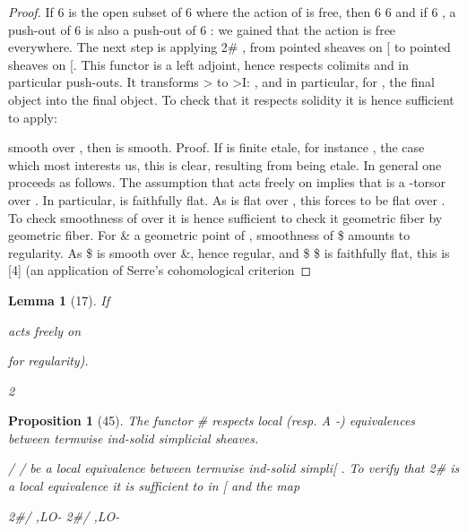 \documentclass[11pt,a4paper]{article}
\theoremstyle{plain}
\newtheorem{lemma}[theorem]{Lemma}
\newtheorem{proposition}[theorem]{Proposition}
\theoremstyle{definition}
\begin{document}
\begin{proof} If 6  is the open subset of 6 where the action of is free, then   6  6
and if  
 6 , a push-out of  6 is also a push-out of   6 : we
gained that the action is free everywhere. The next step is applying 2\# , from pointed
sheaves on [  to pointed sheaves on [. This functor is a left adjoint, hence
respects colimits and in particular push-outs. It transforms > to >I: , and in particular, for 
 , the final object into the final object. To check that it respects
solidity it is hence sufficient to apply:

 smooth over  , then  is smooth.
Proof. If is finite etale, for instance  , the case which most interests us, this is
clear, resulting from 
 being etale. In general one proceeds as follows.
The assumption that
acts freely on  implies that  is a -torsor over  .
In particular, 
 is faithfully flat. As  is flat over  , this forces  to
be flat over  . To check smoothness of  over  it is hence sufficient to check
it geometric fiber by geometric fiber. For \& a geometric point of  , smoothness
of  \$ amounts to regularity. As \$ is smooth over \&, hence regular, and \$
 \$ is faithfully flat, this is [4] (an application of Serre's cohomological criterion
\end{proof}

\begin{lemma}[17]
If

acts freely on



for regularity).

2

\end{lemma}

\begin{proposition}[45]
The functor \# respects local (resp. A -) equivalences between
termwise ind-solid simplicial sheaves.

 / /  be a local equivalence between termwise ind-solid simpli[ . To verify that 2\#  is a local equivalence it is sufficient to
 in [ and    the map


2\#/ ,LO-
 2\#/  ,LO-


\end{proposition}
\end{document}
